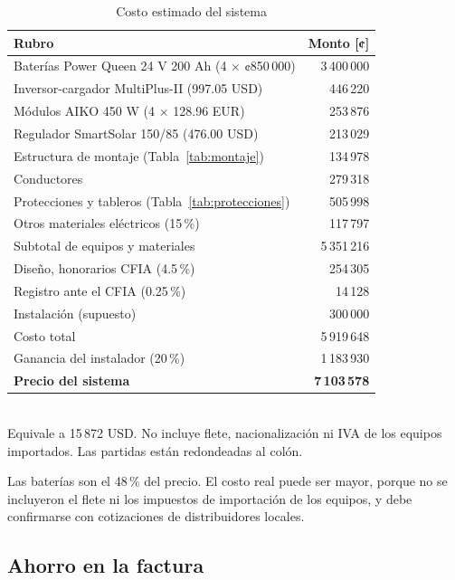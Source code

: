 \begin{table}[!htb]
\caption{Costo estimado del sistema}
\label{tab:costos}
\centering
\footnotesize
\setlength{\tabcolsep}{4pt}
\begin{tabular}{l r}
\toprule
Rubro & Monto [¢] \\
\midrule
Baterías Power Queen 24 V 200 Ah (4 $\times$ ¢850\,000) & 3\,400\,000 \\
Inversor-cargador MultiPlus-II (997.05 USD) & 446\,220 \\
Módulos AIKO 450 W (4 $\times$ 128.96 EUR) & 253\,876 \\
Regulador SmartSolar 150/85 (476.00 USD) & 213\,029 \\
Estructura de montaje (Tabla~\ref{tab:montaje}) & 134\,978 \\
Conductores & 279\,318 \\
Protecciones y tableros (Tabla~\ref{tab:protecciones}) & 505\,998 \\
Otros materiales eléctricos (15\,\%) & 117\,797 \\
\midrule
Subtotal de equipos y materiales & 5\,351\,216 \\
\midrule
Diseño, honorarios CFIA (4.5\,\%) & 254\,305 \\
Registro ante el CFIA (0.25\,\%) & 14\,128 \\
Instalación (supuesto) & 300\,000 \\
\midrule
Costo total & 5\,919\,648 \\
Ganancia del instalador (20\,\%) & 1\,183\,930 \\
\midrule
\textbf{Precio del sistema} & \textbf{7\,103\,578} \\
\bottomrule
\end{tabular}
\\[2pt]
{\footnotesize Equivale a 15\,872 USD. No incluye flete, nacionalización ni IVA de los equipos importados. Las partidas están redondeadas al colón.}
\end{table}

Las baterías son el 48\,\% del precio. El costo real puede ser mayor, porque no se incluyeron el flete ni los impuestos de importación de los equipos, y debe confirmarse con cotizaciones de distribuidores locales.

\subsection{Ahorro en la factura}

